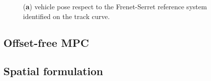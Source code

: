\documentclass[conference]{IEEEtran} %
\renewcommand{\vec}[1]{\boldsymbol{#1}}
\DeclarePairedDelimiter{\norm}{\lVert}{\rVert}
\begin{document}
%

\begin{figure}[htb] \centering
	\caption{(\textbf{a}) vehicle pose respect to the Frenet-Serret reference system identified on the track curve.}
	\label{fig:scheme_frenet_serret}
\end{figure}

\subsection{Offset-free MPC}


\subsection{Spatial formulation}
\end{document}
